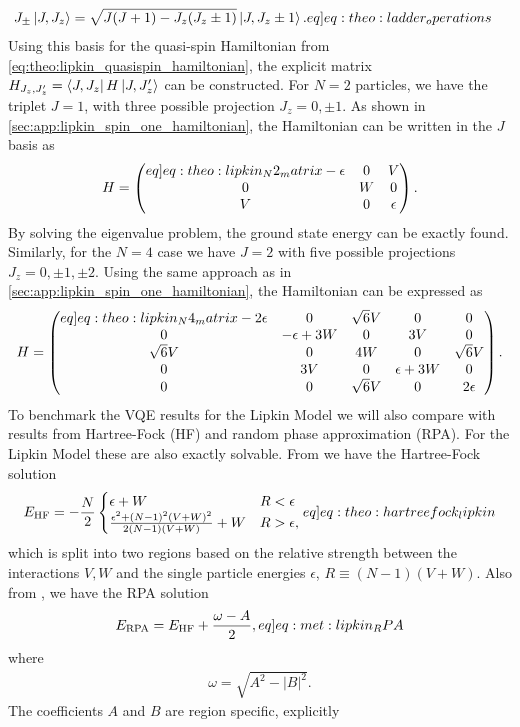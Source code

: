 \begin{align}
    J_\pm \ket{J,J_z} &= \sqrt{J(J+1)-J_z (J_z \pm 1)} \ket{J,J_z \pm 1}. \label[eq]{eq:theo:ladder_operations}
\end{align}
Using this basis for the quasi-spin Hamiltonian from \cref{eq:theo:lipkin_quasispin_hamiltonian}, the explicit matrix $H_{J_z,J'_z} = \bra{J,J_z} H \ket{J,J_z'}$ can be constructed. For $N=2$ particles, we have the triplet $J=1$, with three possible projection $J_z = 0, \pm 1$. As shown in \cref{sec:app:lipkin_spin_one_hamiltonian}, the Hamiltonian can be written in the $J$ basis as
\begin{align}
    H = \begin{pmatrix} \label[eq]{eq:theo:lipkin_N2_matrix}
        -\epsilon & 0 & V \\
        0 & W & 0 \\
        V & 0 & \epsilon
    \end{pmatrix}.
\end{align}
By solving the eigenvalue problem, the ground state energy can be exactly found. Similarly, for the $N=4$ case we have $J = 2$ with five possible projections $J_z = 0,\pm1,\pm2$. Using the same approach as in \cref{sec:app:lipkin_spin_one_hamiltonian}, the Hamiltonian can be expressed as  
\begin{align}
    H = \begin{pmatrix}\label[eq]{eq:theo:lipkin_N4_matrix}
        -2\epsilon & 0  & \sqrt{6}V &0 &0 \\
        0 & -\epsilon + 3W & 0 & 3V & 0 \\
        \sqrt{6}V & 0 & 4W & 0 & \sqrt{6}V \\
        0 & 3V & 0 & \epsilon + 3W & 0 \\
        0 & 0 & \sqrt{6}V & 0 & 2\epsilon
    \end{pmatrix}.
\end{align}
To benchmark the VQE results for the Lipkin Model we will also compare with results from Hartree-Fock (HF) and random phase approximation (RPA). For the Lipkin Model these are also exactly solvable. From \citep{coHartreeFockRandom2015} we have the Hartree-Fock solution
\begin{align}
    \EHF = -\frac{N}{2}\begin{cases}
        \epsilon + W & R < \epsilon \\
        \frac{\epsilon^2 + (N-1)^2 (V+W)^2 }{2(N-1)(V+W)} + W & R > \epsilon,
    \end{cases} \label[eq]{eq:theo:hartreefock_lipkin}
\end{align}
which is split into two regions based on the relative strength between the interactions $V,W$ and the single particle energies $\epsilon$, $R \equiv (N-1)(V+W)$. Also from \citep{coHartreeFockRandom2015}, we have the RPA solution
\begin{align}
    \ERPA = \EHF + \frac{\omega - A}{2}, \label[eq]{eq:met:lipkin_RPA}
\end{align}
where
\begin{align*}
    \omega = \sqrt{A^2 - |B|^2}.
\end{align*}
The coefficients $A$ and $B$ are region specific, explicitly

